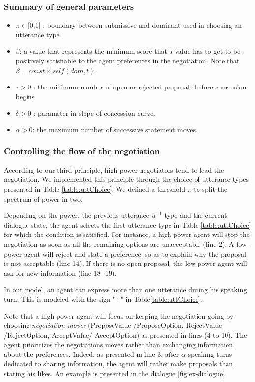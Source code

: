 \documentclass{llncs}
\begin{document}
	\subsubsection*{Summary of general parameters }
	\begin{itemize}[noitemsep]
		
		\item $\pi \in $[0,1] : boundary between submissive and dominant used in
		choosing an utterance type
		\item $\beta$:  a value that represents the minimum score that a value has to get to be positively satisfiable to the agent preferences in the negotiation. Note that $\beta = const \times self(dom,t)$.
		\item $\tau > 0$ : the minimum number of open or rejected proposals before concession begins
		\item $\delta > 0$ : parameter in slope of concession curve.
		\item $\alpha> 0$: the maximum number of successive statement moves.
	\end{itemize}
	
	\subsubsection{Controlling the flow of the negotiation}
	According to our third principle, high-power negotiators tend to lead the negotiation. We implemented this principle through the choice of utterance types presented in Table \ref{table:uttChoice}.		
	We defined a threshold $\pi$ to split the spectrum of power in two.
	
	Depending on the power, the previous utterance $u^{-1}$ type and the current dialogue state, the agent selects the first utterance type in Table \ref{table:uttChoice} for which the condition is satisfied. For instance, a high-power agent will stop the negotiation as soon as all the remaining options are unacceptable (line 2). A low-power agent will reject and state a preference, so as to explain why the proposal is not acceptable (line 14). If there is no open proposal, the low-power agent will ask for new information (line 18 -19).
	
	In our model, an agent can express more than one utterance during his speaking turn. This is modeled  with the sign "+" in Table\ref{table:uttChoice}.
	
	Note that a high-power agent will focus on keeping the negotiation going by choosing \emph{negotiation moves} (ProposeValue /ProposeOption, RejectValue /RejectOption, AcceptValue/ AcceptOption) as presented in lines (4 to 10). The agent prioritizes the negotiations moves rather than exchanging information about the preferences. Indeed, as presented in line 3, after $\alpha$  speaking turns dedicated to sharing information, the agent will rather make proposals than stating his likes. An example is presented in the dialogue \ref{fig:ex-dialogue}. 
	
\end{document}
